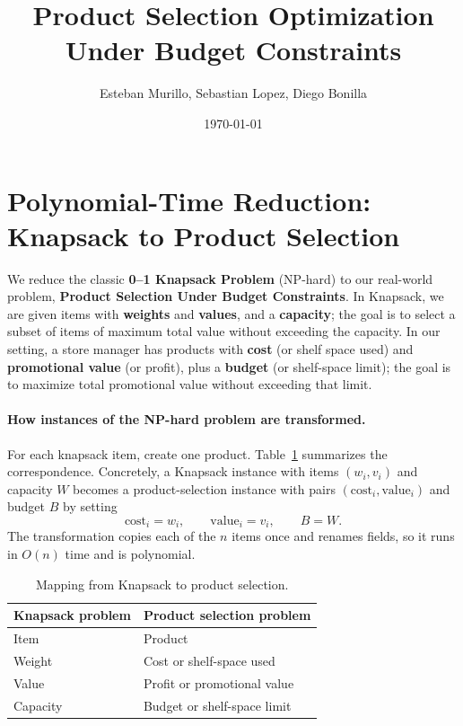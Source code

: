 \documentclass[11pt]{article}
\title{Product Selection Optimization Under Budget Constraints}
\author{Esteban Murillo, Sebastian Lopez, Diego Bonilla}
\date{\today}
\begin{document}
\maketitle

\section{Polynomial-Time Reduction: Knapsack to Product Selection}

We reduce the classic \textbf{0--1 Knapsack Problem} (NP-hard) to our real-world problem, \textbf{Product Selection Under Budget Constraints}. In Knapsack, we are given items with \textbf{weights} and \textbf{values}, and a \textbf{capacity}; the goal is to select a subset of items of maximum total value without exceeding the capacity. In our setting, a store manager has products with \textbf{cost} (or shelf space used) and \textbf{promotional value} (or profit), plus a \textbf{budget} (or shelf-space limit); the goal is to maximize total promotional value without exceeding that limit.

\paragraph{How instances of the NP-hard problem are transformed.}
For each knapsack item, create one product. Table~\ref{tab:reduction} summarizes the correspondence. Concretely, a Knapsack instance with items $(w_i, v_i)$ and capacity $W$ becomes a product-selection instance with pairs $(\text{cost}_i, \text{value}_i)$ and budget $B$ by setting
\begin{equation*}
  \text{cost}_i = w_i,\qquad \text{value}_i = v_i,\qquad B = W.
\end{equation*}
The transformation copies each of the $n$ items once and renames fields, so it runs in $O(n)$ time and is polynomial.

\begin{table}[htbp]
  \centering
  \caption{Mapping from Knapsack to product selection.}
  \label{tab:reduction}
  \begin{tabular}{l l}
    \hline
    Knapsack problem & Product selection problem \\
    \hline
    Item & Product \\
    Weight & Cost or shelf-space used \\
    Value & Profit or promotional value \\
    Capacity & Budget or shelf-space limit \\
    \hline
  \end{tabular}
\end{table}
\end{document}
